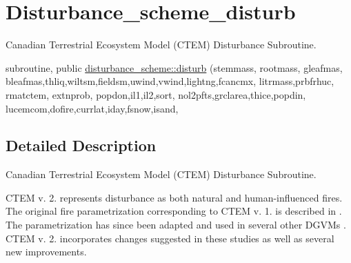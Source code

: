 \hypertarget{group__disturbance__scheme__disturb}{}\section{Disturbance\+\_\+scheme\+\_\+disturb}
\label{group__disturbance__scheme__disturb}


Canadian Terrestrial Ecosystem Model (C\+T\+E\+M) Disturbance Subroutine.  


\begin{DoxyCompactItemize}
\item 
subroutine, public \hyperlink{group__disturbance__scheme__disturb_ga0bed06e74bd06c387ae02bc545bf2a25}{disturbance\+\_\+scheme\+::disturb} (stemmass, rootmass, gleafmas, bleafmas,thliq,wiltsm,fieldsm,uwind,vwind,lightng,fcancmx, litrmass,prbfrhuc, rmatctem, extnprob, popdon,il1,il2,sort, nol2pfts,grclarea,thice,popdin, lucemcom,dofire,currlat,iday,fsnow,isand,
\end{DoxyCompactItemize}


\subsection{Detailed Description}
Canadian Terrestrial Ecosystem Model (C\+T\+E\+M) Disturbance Subroutine. 

C\+T\+E\+M v. 2. represents disturbance as both natural and human-\/influenced fires. The original fire parametrization corresponding to C\+T\+E\+M v. 1. is described in \cite{Arora20052ac}. The parametrization has since been adapted and used in several other D\+G\+V\+Ms \cite{Kloster2010-633} \cite{Kloster2012-c79} \cite{Migliavacca2013-eh} \cite{Li20121c2}. C\+T\+E\+M v. 2. incorporates changes suggested in these studies as well as several new improvements.

